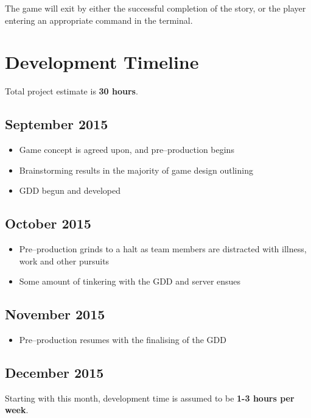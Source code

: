 \documentclass[letterpaper, twoside, 12pt]{memoir}
\begin{document}
The game will exit by either the successful completion of the story, or the player entering an appropriate command in the terminal.

\chapter{Development Timeline}

Total project estimate is \textbf{30 hours}.

\section{September 2015}

\begin{itemize}
\item Game concept is agreed upon, and pre--production begins
\item Brainstorming results in the majority of game design outlining 
\item GDD begun and developed
\end{itemize}

\section{October 2015}

\begin{itemize}
\item Pre--production grinds to a halt as team members are distracted with illness, work and other pursuits
\item Some amount of tinkering with the GDD and server ensues
\end{itemize}

\section{November 2015}

\begin{itemize}
\item Pre--production resumes with the finalising of the GDD
\end{itemize}

\section{December 2015}

Starting with this month, development time is assumed to be \textbf{1-3 hours per week}.
\end{document}
